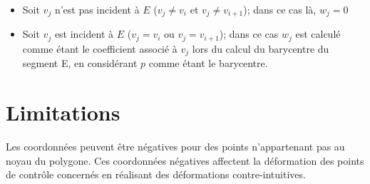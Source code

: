 \begin{itemize}
\item Soit $v_j$ n'est pas incident à $E$ ($v_j \neq v_i$ et $v_j \neq
v_{i+1}$); dans ce cas là, $w_j = 0$
\item Soit $v_j$ est incident à $E$ ($v_j = v_i$ ou $v_j = v_{i+1}$); dans ce
cas $w_j$ est calculé comme étant le coefficient associé à $v_j$ lors du calcul
du barycentre du segment E, en considérant $p$ comme étant le barycentre.
\end{itemize}

\section{Limitations}

Les coordonnées peuvent être négatives pour des points n'appartenant pas au
noyau du polygone. Ces coordonnées négatives affectent la déformation des points
de contrôle concernés en réalisant des déformations contre-intuitives.